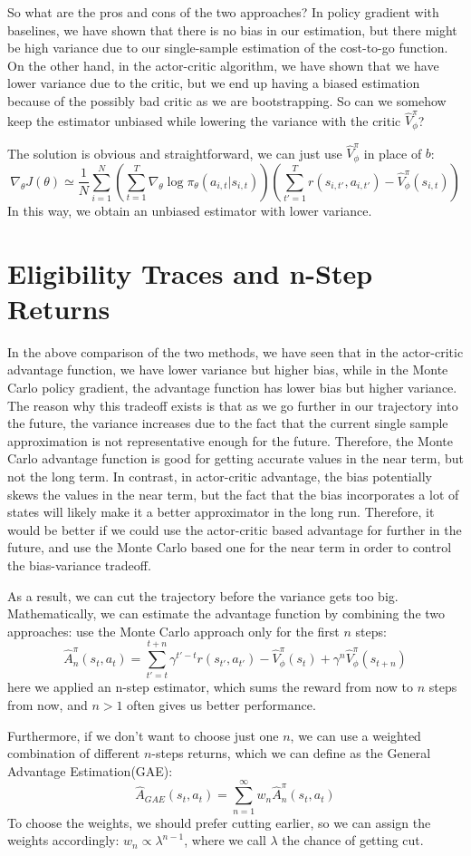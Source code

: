 So what are the pros and cons of the two approaches? In policy gradient with baselines, we have shown that there is no bias in our estimation, but there might be high variance due to our single-sample estimation of the cost-to-go function. On the other hand, in the actor-critic algorithm, we have shown that we have lower variance due to the critic, but we end up having a biased estimation because of the possibly bad critic as we are bootstrapping. So can we somehow keep the estimator unbiased while lowering the variance with the critic $\hat{V}^\pi_\phi$?

The solution is obvious and straightforward, we can just use $\hat{V}^\pi_\phi$ in place of $b$:
$$\nabla_\theta J(\theta) \simeq \frac{1}{N}\sum_{i=1}^N\left(\sum_{t=1}^T\nabla_\theta \log\pi_\theta(a_{i,t}|s_{i,t})\right)\left(\sum_{t'=1}^T r(s_{i,t'},a_{i,t'}) - \hat{V}^\pi_\phi(s_{i,t})\right)$$
In this way, we obtain an unbiased estimator with lower variance. 

\section{Eligibility Traces and n-Step Returns}
In the above comparison of the two methods, we have seen that in the actor-critic advantage function, we have lower variance but higher bias, while in the Monte Carlo policy gradient, the advantage function has lower bias but higher variance. The reason why this tradeoff exists is that as we go further in our trajectory into the future, the variance increases due to the fact that the current single sample approximation is not representative enough for the future. Therefore, the Monte Carlo advantage function is good for getting accurate values in the near term, but not the long term. In contrast, in actor-critic advantage, the bias potentially skews the values in the near term, but the fact that the bias incorporates a lot of states will likely make it a better approximator in the long run. Therefore, it would be better if we could use the actor-critic based advantage for further in the future, and use the Monte Carlo based one for the near term in order to control the bias-variance tradeoff.

As a result, we can cut the trajectory before the variance gets too big. Mathematically, we can estimate the advantage function by combining the two approaches: use the Monte Carlo approach only for the first $n$ steps:
$$\hat{A}^\pi_n(s_t,a_t) = \sum_{t'=t}^{t+n}\gamma^{t'-t}r(s_{t'},a_{t'}) - \hat{V}^\pi_\phi(s_t)+\gamma^n\hat{V}^\pi_\phi(s_{t+n})$$
here we applied an n-step estimator, which sums the reward from now to $n$ steps from now, and $n>1$ often gives us better performance.

Furthermore, if we don't want to choose just one $n$, we can use a weighted combination of different $n$-steps returns, which we can define as the General Advantage Estimation(GAE):
$$ \hat{A}_{GAE}(s_t,a_t) = \sum_{n=1}^\infty w_n \hat{A}^\pi_n(s_t,a_t)$$
To choose the weights, we should prefer cutting earlier, so we can assign the weights accordingly: $w_n\propto \lambda^{n-1}$, where we call $\lambda$ the chance of getting cut.

